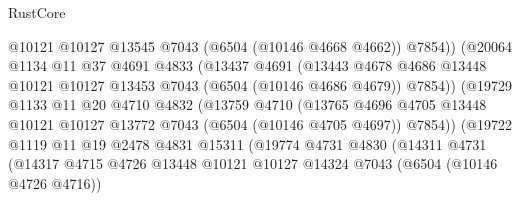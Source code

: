 \begin{lexlean}{RustCore}
\begin{coremodule}
                                @10121
                                @10127
                                @13545
                                @7043
                                (@6504 (@10146 @4668 @4662))
                                @7854))
                            (@20064
                              @1134
                              @11
                              @37
                              @4691
                              @4833
                              (@13437
                                @4691
                                (@13443
                                  @4678
                                  @4686
                                  @13448
                                  @10121
                                  @10127
                                  @13453
                                  @7043
                                  (@6504 (@10146 @4686 @4679))
                                  @7854))
                              (@19729
                                @1133
                                @11
                                @20
                                @4710
                                @4832
                                (@13759
                                  @4710
                                  (@13765
                                    @4696
                                    @4705
                                    @13448
                                    @10121
                                    @10127
                                    @13772
                                    @7043
                                    (@6504 (@10146 @4705 @4697))
                                    @7854))
                                (@19722
                                  @1119
                                  @11
                                  @19
                                  @2478
                                  @4831
                                  @15311
                                  (@19774
                                    @4731
                                    @4830
                                    (@14311
                                      @4731
                                      (@14317
                                        @4715
                                        @4726
                                        @13448
                                        @10121
                                        @10127
                                        @14324
                                        @7043
                                        (@6504 (@10146 @4726 @4716))

\end{coremodule}
\end{lexlean}
